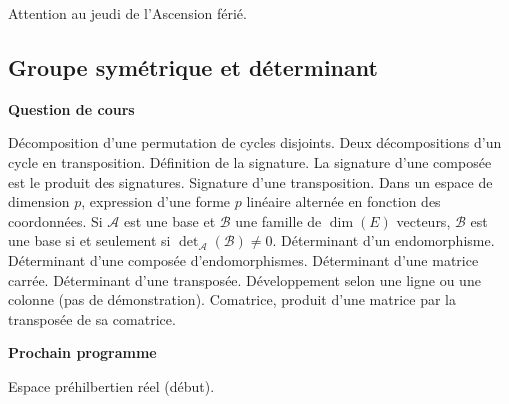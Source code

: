 





Attention au jeudi de l'Ascension férié.


\subsection{Groupe symétrique et déterminant}



\bigskip

\begin{center}
 \textbf{Question de cours}
\end{center}
Décomposition d'une permutation de cycles disjoints. Deux décompositions d'un cycle en transposition. Définition de la signature. La signature d'une composée est le produit des signatures. Signature d'une transposition.\newline
Dans un espace de dimension $p$, expression d'une forme $p$ linéaire alternée en fonction des coordonnées. Si $\mathcal{A}$ est une base et $\mathcal{B}$ une famille de $\dim(E)$ vecteurs, $\mathcal{B}$ est une base si et seulement si $\det_{\mathcal{A}}(\mathcal{B})\neq 0$. Déterminant d'un endomorphisme. Déterminant d'une composée d'endomorphismes. Déterminant d'une matrice carrée. Déterminant d'une transposée. Développement selon une ligne ou une colonne (pas de démonstration). Comatrice, produit d'une matrice par la transposée de sa comatrice.

\begin{center}
 \textbf{Prochain programme}
\end{center}
Espace préhilbertien réel (début).


